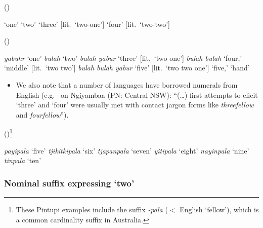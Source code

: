 \documentclass{article}
\begin{document}
\begin{exe}
   (\citealt[47-48]{davies89})
  \begin{xlist}
    \ex  \textit{}  `one'
    \ex \textit{} `two'
    \ex \textit{}  `three' [lit.\ `two-one']
    \ex \textit{} `four' [lit.\ `two-two']
  \end{xlist}
   (\citealt[60]{sharpe98})
  \begin{xlist}
    \ex \textit{yabuhr} `one'
    \ex \textit{bulah} `two'
    \ex \textit{bulah yabur} `three' [lit.\ `two one']
    \ex \textit{bulah bulah} `four,' `middle' [lit.\ `two two']
    \ex \textit{bulah bulah yabur} `five' [lit.\ `two two one']
    \ex \textit{} `five,' `hand'
  \end{xlist}
\end{exe}


\begin{itemize}
\item We also note that a number of languages have borrowed numerals from English (e.g.\ \citet[73]{donaldson80} on Ngiyambaa (PN: Central NSW): ``(\ldots) first attempts to elicit `three' and `four' were usually met with contact jargon forms like \textit{threefellow} and {\it fourfellow}'').
\end{itemize}

\begin{exe}
   (\citealt{pintupi77})\footnote{These Pintupi examples  include the suffix {\it -pala} ($<$ English `fellow'), which is a common cardinality suffix in Australia.} \begin{xlist}
    \ex \textit{payipala} `five'
    \ex \textit{tjikitkipala} `six' 
    \ex \textit{tjapanpala} `seven' 
    \ex \textit{yitipala} `eight' 
    \ex \textit{nayinpala} `nine' 
    \ex \textit{tinpala} `ten' 
  \end{xlist}
\end{exe}




\subsubsection{Nominal suffix expressing `two'}
\end{document}
